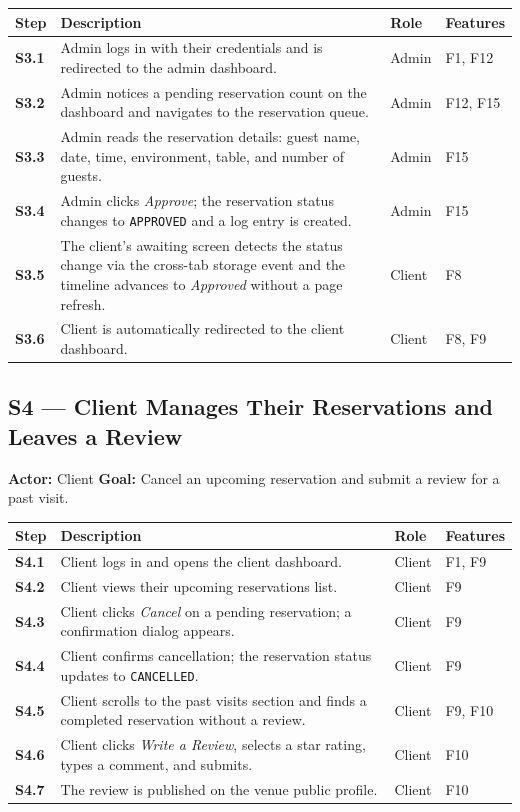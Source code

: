 \documentclass[12pt,a4paper]{article}
\begin{document}
\begin{longtable}{>{\bfseries}l L{6.5cm} l L{3cm}}
    \toprule
    Step & Description & Role & Features \\
    \midrule
    S3.1 & Admin logs in with their credentials and is redirected to
           the admin dashboard. & Admin & F1, F12 \\
    S3.2 & Admin notices a pending reservation count on the dashboard
           and navigates to the reservation queue. & Admin & F12, F15 \\
    S3.3 & Admin reads the reservation details: guest name, date, time,
           environment, table, and number of guests. & Admin & F15 \\
    S3.4 & Admin clicks \emph{Approve}; the reservation status changes
           to \texttt{APPROVED} and a log entry is created. & Admin & F15 \\
    S3.5 & The client's awaiting screen detects the status change via
           the cross-tab storage event and the timeline advances to
           \emph{Approved} without a page refresh. & Client & F8 \\
    S3.6 & Client is automatically redirected to the client dashboard. & Client & F8, F9 \\
    \bottomrule
\end{longtable}

\subsection*{S4 --- Client Manages Their Reservations and Leaves a Review}
\begin{mdframed}[style=scenariobox]
\textbf{Actor:} Client \quad
\textbf{Goal:} Cancel an upcoming reservation and submit a review for a
past visit.
\end{mdframed}

\begin{longtable}{>{\bfseries}l L{6.5cm} l L{3cm}}
    \toprule
    Step & Description & Role & Features \\
    \midrule
    S4.1 & Client logs in and opens the client dashboard. & Client & F1, F9 \\
    S4.2 & Client views their upcoming reservations list. & Client & F9 \\
    S4.3 & Client clicks \emph{Cancel} on a pending reservation; a
           confirmation dialog appears. & Client & F9 \\
    S4.4 & Client confirms cancellation; the reservation status updates
           to \texttt{CANCELLED}. & Client & F9 \\
    S4.5 & Client scrolls to the past visits section and finds a
           completed reservation without a review. & Client & F9, F10 \\
    S4.6 & Client clicks \emph{Write a Review}, selects a star rating,
           types a comment, and submits. & Client & F10 \\
    S4.7 & The review is published on the venue public profile. & Client & F10 \\
    \bottomrule
\end{longtable}
\end{document}
